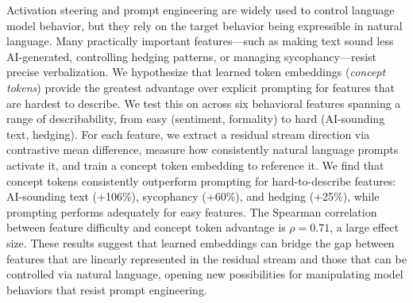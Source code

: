 Activation steering and prompt engineering are widely used to control language model behavior, but they rely on the target behavior being expressible in natural language. Many practically important features---such as making text sound less AI-generated, controlling hedging patterns, or managing sycophancy---resist precise verbalization. We hypothesize that learned token embeddings (\emph{concept tokens}) provide the greatest advantage over explicit prompting for features that are hardest to describe. We test this on \pythia across six behavioral features spanning a range of describability, from easy (sentiment, formality) to hard (AI-sounding text, hedging). For each feature, we extract a residual stream direction via contrastive mean difference, measure how consistently natural language prompts activate it, and train a concept token embedding to reference it. We find that concept tokens consistently outperform prompting for hard-to-describe features: AI-sounding text (+106\%), sycophancy (+60\%), and hedging (+25\%), while prompting performs adequately for easy features. The Spearman correlation between feature difficulty and concept token advantage is $\rho = 0.71$, a large effect size. These results suggest that learned embeddings can bridge the gap between features that are linearly represented in the residual stream and those that can be controlled via natural language, opening new possibilities for manipulating model behaviors that resist prompt engineering.
